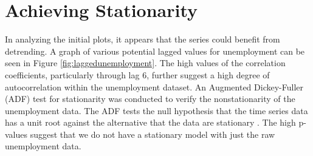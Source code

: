 \documentclass[twoside,twocolumn]{article}
\begin{document}
\section{Achieving Stationarity}

In analyzing the initial plots, it appears that the series could benefit from detrending. A graph of various potential lagged values for unemployment can be seen in Figure \ref{fig:laggedunemployment}. The high values of the correlation coefficients, particularly through lag 6, further suggest a high degree of autocorrelation within the unemployment dataset.    An Augmented Dickey-Fuller (ADF) test for stationarity was conducted to verify the nonstationarity of the unemployment data.  The ADF tests the null hypothesis that the time series data has a unit root against the alternative that the data are stationary \citep{Shumway2006}. The high p-values suggest that we do not have a stationary model with just the raw unemployment data.
			
\end{document}
